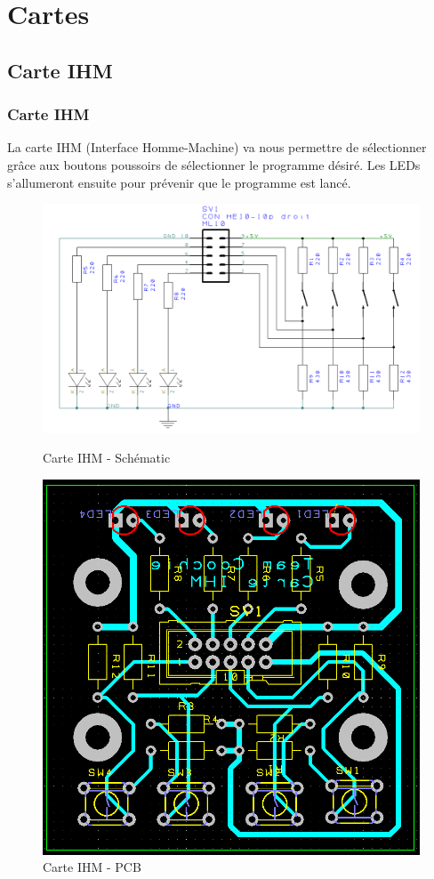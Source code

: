\section{Cartes}

\subsection{Carte IHM}
\begin{frame}
    \frametitle{Carte IHM}
    La carte IHM (Interface Homme-Machine) va nous permettre de sélectionner grâce aux boutons poussoirs de sélectionner le programme désiré. Les LEDs s'allumeront ensuite pour prévenir que le programme est lancé.

    \vfill
    \begin{figure}[H]
        \centering
        \begin{minipage}{.5\textwidth}
            \centering
            \includegraphics[width=.7\linewidth]{Images/carteIHM_sch.png}
            \caption{Carte IHM - Schématic}
            \label{fig:ihmsch}
        \end{minipage}%
        \begin{minipage}{.5\textwidth}
            \centering
            \includegraphics[width=.5\linewidth]{Images/carteIHM_pcb.png}
            \caption{Carte IHM - PCB}
        \label{fig:ihmpcb}
        \end{minipage}
    \end{figure}
    
\end{frame}

